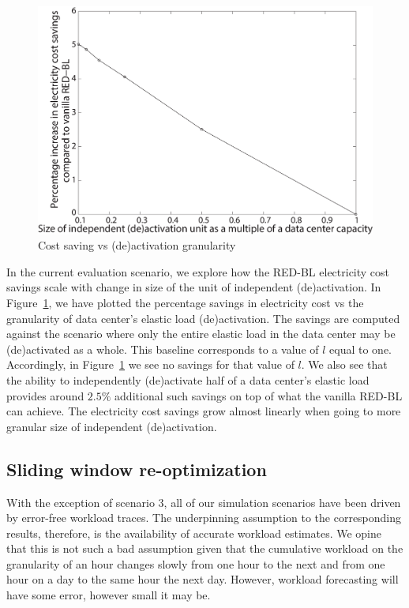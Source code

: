 \begin{figure}
    \centering
    \includegraphics[width=1\textwidth]{pics/s6.eps}
\caption{Cost saving vs (de)activation granularity}
\label{fig:granular-deactivation}
\end{figure}

In the current evaluation scenario, we explore how the RED-BL electricity cost savings scale with change in size of the unit of independent (de)activation. In Figure~\ref{fig:granular-deactivation}, we have plotted the percentage savings in electricity cost vs the granularity of data center's elastic load (de)activation. The savings are computed against the scenario where only the entire elastic load in the data center may be (de)activated as a whole. This baseline corresponds to a value of $l$ equal to one. Accordingly, in Figure~\ref{fig:granular-deactivation} we see no savings for that value of $l$. We also see that the ability to independently (de)activate half of a data center's elastic load provides around $2.5\%$ additional such savings on top of what the vanilla RED-BL can achieve. The electricity cost savings grow almost linearly when going to more granular size of independent (de)activation.

\subsection{Sliding window re-optimization}
With the exception of scenario 3, all of our simulation scenarios have been driven by error-free workload traces. The underpinning assumption to the corresponding results, therefore, is the availability of accurate workload estimates. We opine that this is not such a bad assumption given that the cumulative workload on the granularity of an hour changes slowly from one hour to the next and from one hour on a day to the same hour the next day. However, workload forecasting will have some error, however small it may be. 

